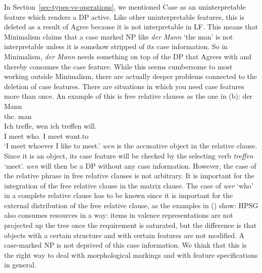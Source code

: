 \documentclass[output=paper
	        ,collection
	        ,collectionchapter
 	        ,biblatex
                ,babelshorthands
                ,newtxmath
                ,draftmode
                ,colorlinks, citecolor=brown
]{langscibook}
\begin{document}
In Section~\ref{sec-types-vs-operations}, we mentioned Case as an uninterpretable feature which
renders a DP active. Like other uninterpretable features, this is deleted as a result of Agree
because it is not interpretable in LF. 
This means that Minimalism claims
that a case marked NP like \emph{der Mann} `the man' is not interpretable unless it is somehow
stripped of its case information.
So in Minimalism, \emph{der Mann} needs something on top of the DP
that Agrees with and thereby consumes the case feature. While this seems cumbersome to most working outside Minimalism,
there are actually deeper problems connected to the deletion of case features. There are
situations in which you need case features more than once. An example of this is free relative
clauses as the one in (b):
\eal
\ex 
\gll der Mann\\
     the.\nom{} man\\
\ex
\gll Ich treffe, wen ich treffen will.\\
     I meet who.\acc{} I meet want.to\\
\glt `I meet whoever I like to meet.'
\zl
\emph{wen} is the accusative object in the relative clause. Since it is an object, its case feature
will be checked by the selecting verb \emph{treffen} `meet'. \emph{wen} will then be a DP without
any case information. However, the case of the relative phrase in free relative clauses is not
arbitrary. It is important for the integration of the free relative clause in the matrix clause. The
case of \emph{wer} `who' in a complete relative clause has to be known since it is important for the
external distribution of the free relative clause, as the examples in () show:
\eal
{}
\zl
HPSG also consumes resources in a way: items in valence representations are not projected up the
tree once the requirement is saturated, but the difference is that objects with a certain structure
and with certain features are not modified. A case-marked NP is not deprived of this case
information. We think that this is the right way to deal with morphological
markings and with feature specifications in general.
\end{document}
